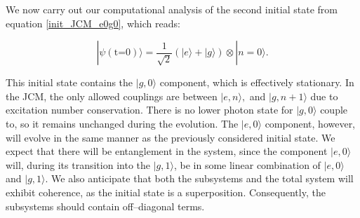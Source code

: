 \documentclass[11pt]{article}
\newcounter{subsubsubsection}[subsubsection]
\begin{document}

We now carry out our computational analysis of the second initial state from equation \eqref{init_JCM_e0g0}, which reads:

\begin{equation*}
    |\psi (\text{t=0})\rangle = \frac{1}{\sqrt{2}}(|e\rangle + |g\rangle)\otimes|n=0\rangle.
\end{equation*}

\noindent This initial state contains the $|g,0\rangle$ component, which is effectively stationary. In the JCM, the only allowed couplings are between $|e,n\rangle,$ and $|g,n+1\rangle$ due to excitation number conservation. There is no lower photon state for $|g,0\rangle$ couple to,  so it remains unchanged during the evolution. The $|e,0\rangle$ component, however, will evolve in the same manner as the previously considered initial state. We expect that there will be entanglement in the system, since the component $|e,0\rangle$ will, during its transition into the $|g,1\rangle$, be in some linear combination of $|e,0\rangle$ and $|g,1\rangle$. We also anticipate that both the subsystems and the total system will exhibit coherence, as the initial state is a superposition. Consequently, the subsystems should contain off--diagonal terms.\\
\end{document}
